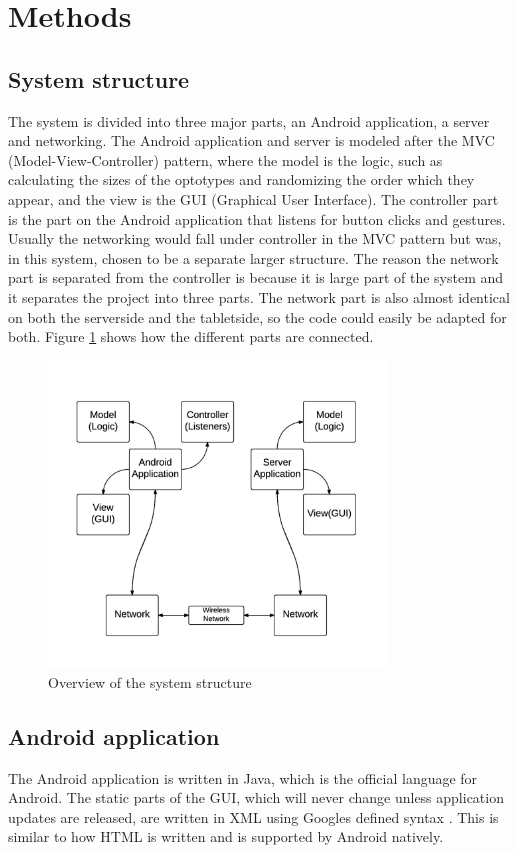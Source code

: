 \documentclass[12pt,a4paper,notitlepage]{report}
\begin{document}
\section{Methods}
\subsection{System structure}
The system is divided into three major parts, an Android application, a server and networking. The Android application and server is modeled after the MVC (Model-View-Controller) pattern, where the model is the logic, such as calculating the sizes of the optotypes and randomizing the order which they appear, and the view is the GUI (Graphical User Interface). The controller part is the part on the Android application that listens for button clicks and gestures. Usually the networking would fall under controller in the MVC pattern but was, in this system, chosen to be a separate larger structure. The reason the network part is separated from the controller is because it is large part of the system and it separates the project into three parts. The network part is also almost identical on both the serverside and the tabletside, so the code could easily be adapted for both. Figure \ref{system_structure} shows how the different parts are connected.

\begin{figure}[ht!]
\centering
\includegraphics[width=90mm]{images/system_structure.png}
\caption{Overview of the system structure\label{system_structure}}
\end{figure}

\subsection{Android application}
The Android application is written in Java, which is the official language for Android. The static parts of the GUI, which will never change unless application updates are released, are written in XML using Googles defined syntax \cite{android_gui}. This is similar to how HTML is written and is supported by Android natively.
\end{document}
